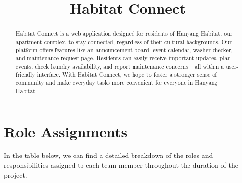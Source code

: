 \documentclass[conference]{IEEEtran}
\begin{document}
\title{Habitat Connect\\
}


\author{
\and
{}
\and
{}
}
\maketitle


\begin{abstract}
Habitat Connect is a web application designed for
residents of Hanyang Habitat, our apartment complex, to stay
connected, regardless of their cultural backgrounds. Our
platform offers features like an announcement board, event
calendar, washer checker, and maintenance request page.
Residents can easily receive important updates, plan events,
check laundry availability, and report maintenance concerns –
all within a user-friendly interface. With Habitat Connect, we
hope to foster a stronger sense of community and make
everyday tasks more convenient for everyone in Hanyang
Habitat.
\end{abstract}




\section*{Role Assignments}
In the table below, we can find a detailed breakdown of the roles and responsibilities assigned to each team member throughout the duration of the project.
\end{document}
